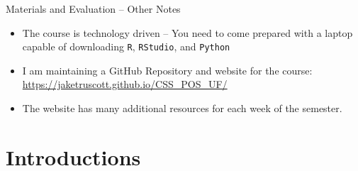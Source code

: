 \documentclass[
  ignorenonframetext,
]{beamer}
\providecommand{\tightlist}{%
  \setlength{\itemsep}{0pt}\setlength{\parskip}{0pt}}
\begin{document}
\begin{frame}{Materials and Evaluation -- Other Notes}
\label{materials-and-evaluation-other-notes}
\begin{itemize}
\tightlist
\item
  The course is technology driven -- You need to come prepared with a
  laptop capable of downloading \texttt{R}, \texttt{RStudio}, and
  \texttt{Python}

  \par \vspace{2.5mm}
\item
  I am maintaining a GitHub Repository and website for the course:
  \url{https://jaketruscott.github.io/CSS_POS_UF/}

  \par \vspace{2.5mm}
\item
  The website has many additional resources for each week of the
  semester.
\end{itemize}
\end{frame}

\section{Introductions}\label{introductions}
\end{document}
